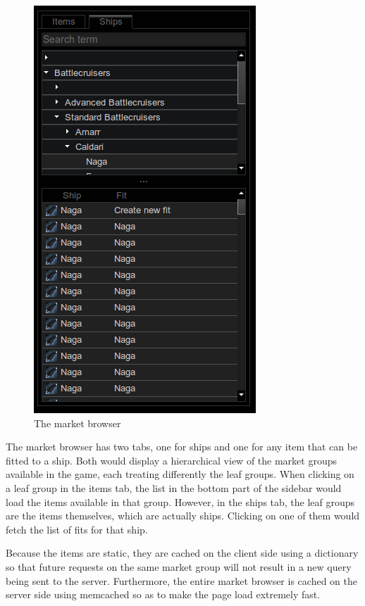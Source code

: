 \begin{figure}[h]
\centering
\includegraphics[scale=0.5]{src/img/marketbrowser}
\caption{The market browser}
\label{fig:marketbrowser}
\end{figure}

The market browser has two tabs, one for ships and one for any item that can be fitted to a ship. Both would display a hierarchical view of the market groups available in the game, each treating differently the leaf groups. When clicking on a leaf group in the items tab, the list in the bottom part of the sidebar would load the items available in that group. However, in the ships tab, the leaf groups are the items themselves, which are actually ships. Clicking on one of them would fetch the list of fits for that ship.

Because the items are static, they are cached on the client side using a dictionary so that future requests on the same market group will not result in a new query being sent to the server. Furthermore, the entire market browser is cached on the server side using memcached \cite{memcached} so as to make the page load extremely fast.

